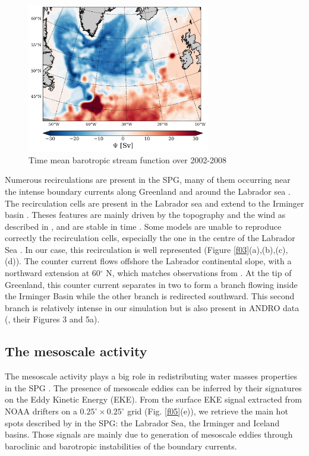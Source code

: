 \documentclass[os, manuscript]{copernicus}
\begin{document}
\begin{figure}[t]
\includegraphics[width=8cm]{../fig_os/f04.pdf}
\caption{Time mean barotropic stream function over 2002-2008}
\label{f04}
\end{figure}

Numerous recirculations are present in the SPG, many of them occurring near the intense boundary currents along Greenland and around the Labrador sea \citep{reverdin2003, flatau2003,cuny2002}. The recirculation cells are present in the Labrador sea \citep{lavender2000,cuny2002} and extend to the Irminger basin \citep{Holliday2009}. Theses features are mainly driven by the topography and the wind as described in \citet{kase2001,spall2003}, and are stable in time \citep{palter2016}. Some models are unable to reproduce correctly the recirculation cells, especially the one in the centre of the Labrador Sea \citep{treguier2005}. In our case, this recirculation is well represented (Figure \ref{f03}(a),(b),(c),(d)). The counter current flows offshore the Labrador continental slope, with a northward extension at 60$^{\circ}$ N, which matches observations from \citet{lavender2005}.  At the tip of Greenland, this counter current separates in two to form a branch flowing inside the Irminger Basin while the other branch is redirected southward. This second branch is relatively intense in our simulation but is also present in ANDRO data (\cite{fischer2018}, their Figures 3 and 5a).  

\subsection{The mesoscale activity}

The mesoscale activity plays a big role in redistributing water masses properties in the SPG \citep{dejong2016,zhao2018b}. The presence of mesoscale eddies can be inferred by their signatures on the Eddy Kinetic Energy (EKE). From the surface EKE signal extracted from NOAA drifters on a $0.25^{\circ}\times 0.25^{\circ}$ grid (Fig. \ref{f05}(e)), we retrieve the main hot spots described by \citet{flatau2003} in the SPG: the Labrador Sea, the Irminger and Iceland basins. Those signals are mainly due to generation of mesoscale eddies through baroclinic and barotropic instabilities of the boundary currents.
\end{document}
